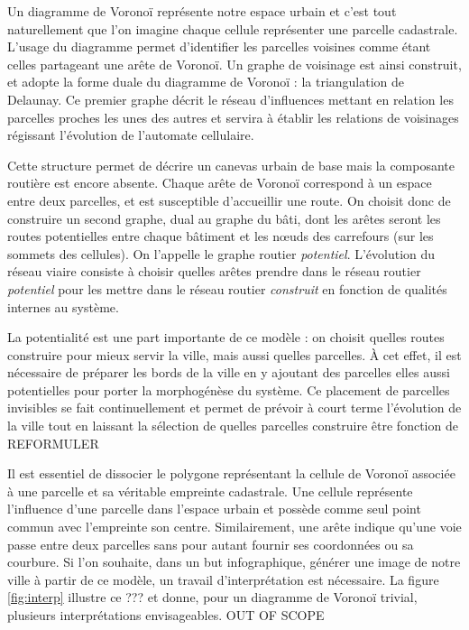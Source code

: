 \documentclass[10pt]{article}
\begin{document}
Un diagramme de Voronoï représente notre espace urbain et c'est tout
naturellement que l'on imagine chaque cellule représenter une parcelle
cadastrale. L'usage du diagramme permet d'identifier les parcelles
voisines comme étant celles partageant une arête de Voronoï. Un graphe
de voisinage est ainsi construit, et adopte la forme duale du
diagramme de Voronoï : la triangulation de Delaunay. Ce premier graphe
décrit le réseau d'influences mettant en relation les parcelles
proches les unes des autres et servira à établir les relations de
voisinages régissant l'évolution de l'automate cellulaire.

Cette structure permet de décrire un canevas urbain de base mais la
composante routière est encore absente. Chaque arête de Voronoï
correspond à un espace entre deux parcelles, et est susceptible
d'accueillir une route. On choisit donc de construire un second
graphe, dual au graphe du bâti, dont les arêtes seront les routes
potentielles entre chaque bâtiment et les n\oe uds des carrefours (sur
les sommets des cellules). On l'appelle le graphe routier
\textit{potentiel}. L'évolution du réseau viaire consiste à choisir
quelles arêtes prendre dans le réseau routier \textit{potentiel} pour
les mettre dans le réseau routier \textit{construit} en fonction de
qualités internes au système.

La potentialité est une part importante de ce modèle : on choisit
quelles routes construire pour mieux servir la ville, mais aussi
quelles parcelles. À cet effet, il est nécessaire de préparer les
bords de la ville en y ajoutant des parcelles elles aussi potentielles
pour porter la morphogénèse du système. Ce placement de parcelles
invisibles se fait continuellement et permet de prévoir à court terme
l'évolution de la ville tout en laissant la sélection de quelles
parcelles construire être fonction de REFORMULER

Il est essentiel de dissocier le polygone représentant la cellule de
Voronoï associée à une parcelle et sa véritable empreinte
cadastrale. Une cellule représente l'influence d'une parcelle dans
l'espace urbain et possède comme seul point commun avec l'empreinte
son centre. Similairement, une arête indique qu'une voie passe entre
deux parcelles sans pour autant fournir ses coordonnées ou sa
courbure. Si l'on souhaite, dans un but infographique, générer une
image de notre ville à partir de ce modèle, un travail
d'interprétation est nécessaire. La figure \ref{fig:interp} illustre
ce ??? et donne, pour un diagramme de Voronoï trivial, plusieurs
interprétations envisageables. OUT OF SCOPE
\end{document}
